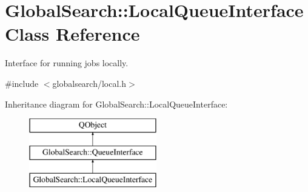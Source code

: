 \hypertarget{classGlobalSearch_1_1LocalQueueInterface}{\section{Global\-Search\-:\-:Local\-Queue\-Interface Class Reference}
\label{classGlobalSearch_1_1LocalQueueInterface}
}


Interface for running jobs locally.  




{\ttfamily \#include $<$globalsearch/local.\-h$>$}

Inheritance diagram for Global\-Search\-:\-:Local\-Queue\-Interface\-:\begin{figure}[H]
\begin{center}
\leavevmode
\includegraphics[height=3.000000cm]{classGlobalSearch_1_1LocalQueueInterface}
\end{center}
\end{figure}
